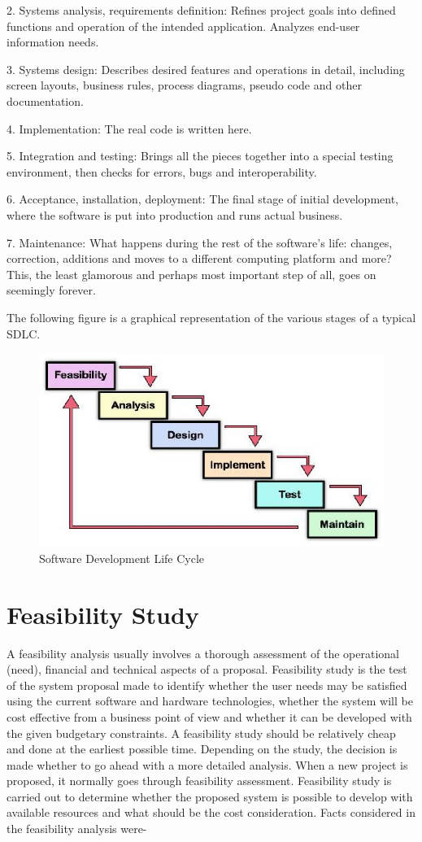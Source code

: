 2. Systems analysis, requirements definition: Refines project goals into defined functions and operation of the intended application. Analyzes end-user information needs.

3. Systems design: Describes desired features and operations in detail, including screen layouts, business rules, process diagrams, pseudo code and other documentation.

4. Implementation: The real code is written here.

5. Integration and testing: Brings all the pieces together into a special testing environment, then checks for errors, bugs and interoperability.

6. Acceptance, installation, deployment: The final stage of initial development, where the software is put into production and runs actual business.

7. Maintenance: What happens during the rest of the software's life: changes, correction, additions and moves to a different computing platform and more? This, the least glamorous and perhaps most important step of all, goes on seemingly forever.

The following figure is a graphical representation of the various stages of a typical SDLC.
\begin{figure}[h]
	\label{ss}    %
	\centering
	\includegraphics[width= 8 cm]{sdlc.jpg}
	\caption{ Software Development Life Cycle}
\end{figure}
\section{Feasibility Study}
A feasibility analysis usually involves a thorough assessment of the operational (need), financial and technical aspects of a proposal. Feasibility study is the test of the system proposal made to identify whether the user needs may be satisfied using the current software and hardware technologies, whether the system will be cost effective from a business point of view and whether it can be developed with the given budgetary constraints. A feasibility study should be relatively cheap and done at the earliest possible time. Depending on the study, the decision is made whether to go ahead with a more detailed analysis. When a new project is proposed, it normally goes through feasibility assessment. Feasibility study is carried out to determine whether the proposed system is possible to develop with available resources and what should be the cost consideration. Facts considered in the feasibility analysis were-

